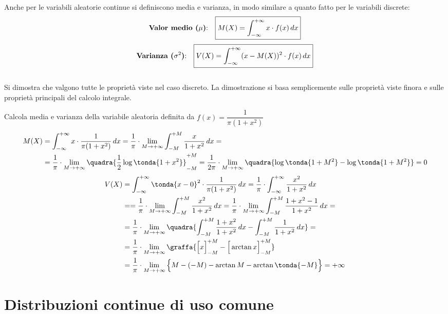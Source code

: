 Anche per le variabili aleatorie continue si definiscono media e varianza, in modo similare a quanto fatto per le variabili discrete:
\[\text{\textbf{Valor medio ($\mu$)}:}\quad  \boxed{M(X) = \int_{-\infty}^{+\infty} x \cdot f(x) \, dx}  \]
\[\text{\textbf{Varianza ($\sigma^2$)}:}\quad  \boxed{V(X) = \int_{-\infty}^{+\infty} (x- M(X))^2 \cdot f(x) \, dx}\]\\[4pt]
Si dimostra che valgono tutte le proprietà viste nel caso discreto. La dimostrazione si basa semplicemente sulle proprietà viste finora e sulle proprietà principali del calcolo integrale.

\begin{esempio} Calcola media e varianza della variabile aleatoria definita da $f(x) = \dfrac{1}{\pi (1+x^2)}$
\[\begin{split}M(X) &= \int_{-\infty}^{+\infty} x\cdot \dfrac{1}{\pi (1+x^2)} \, dx =  \dfrac{1}{\pi}\cdot  \lim_{M \rightarrow +\infty} \int_{-M}^{+M} \dfrac{x}{1+x^2} \,dx = \\
&= \dfrac{1}{\pi}\cdot  \lim_{M \rightarrow +\infty} \quadra{\dfrac{1}{2} \log \tonda{1+x^2}}_{-M}^{+M} =   \dfrac{1}{2 \pi}\cdot  \lim_{M \rightarrow +\infty} \quadra{\log \tonda{1+M^2}-\log \tonda{1+M^2}} =0\end{split}\]
\[\begin{split} V(X) &= \int_{-\infty}^{+\infty} \tonda{x-0}^2 \cdot \dfrac{1}{\pi (1+x^2)} \, dx =\dfrac{1}{\pi}\cdot \int_{-\infty}^{+\infty} \dfrac{x^2}{ 1+x^2} \, dx \\&=
=\dfrac{1}{\pi}\cdot  \lim_{M \rightarrow +\infty} \int_{-M}^{+M} \dfrac{x^2}{ 1+x^2} \, dx = \dfrac{1}{\pi}\cdot  \lim_{M \rightarrow +\infty} \int_{-M}^{+M} \dfrac{1+x^2-1}{ 1+x^2} \, dx = \\&=
\dfrac{1}{\pi}\cdot  \lim_{M \rightarrow +\infty} \quadra{\int_{-M}^{+M} \dfrac{1+x^2}{ 1+x^2}\, dx-\int_{-M}^{+M} \dfrac{1}{ 1+x^2}\, dx} = \\&=\dfrac{1}{\pi}\cdot  \lim_{M \rightarrow +\infty} \graffa{\Big[x\Big]_{-M}^{+M} - \Big[\arctan{x}\Big]_{-M}^{+M}} \\ &=   \dfrac{1}{\pi}\cdot  \lim_{M \rightarrow +\infty} \Big\{M-(-M)-\arctan{M}-\arctan{\tonda{-M}}\Big\} = +\infty \end{split}\]
\end{esempio}


\section{Distribuzioni continue di uso comune}
\label{sec:distrib_continue}

